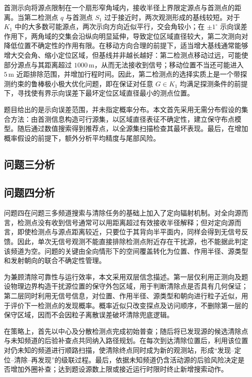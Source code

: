 \documentclass[zihao=-4,a4paper,UTF8,fontset=none]{ctexart}
\begin{document}
首测示向将源点限制在一个扇形窄角域内，接收半径上界限定源点与首测点的距离。当第二检测点 $q$ 与首测点 $S_1$ 过于接近时，两次观测形成的基线较短。对于 $K_1$ 中的大多数可能源点，两次示向方向近似平行，交会角较小；在 $\pm1^\circ$ 示向误差作用下，两角域的交集会沿纵向明显延伸，导致定位区域直径较大，第二次测向对降低位置不确定性的作用有限。在移动方向合理的前提下，适当增大基线通常能够增大交会角、缩小定位区域，但基线并非越长越好：第二检测点移动过远，可能使部分源点与其距离超过 $1000\,\mathrm{m}$，从而无法接收到信号；移动位置不当还可能进入 $5\,\mathrm{m}$ 近距排除范围，并增加行程时间。因此，第二检测点的选择实质上是一个带探测约束的鲁棒极小极大优化问题，即在保证对任意 $G\in K_1$ 均满足探测条件的前提下，寻找使有界示向误差下最坏定位区域直径最小的测点位置。

题目给出的是示向误差范围，并未指定概率分布。本文首先采用无需分布假设的集合方法：由首测信息构造可行源集，以区域直径表征不确定性，建立保守布点模型。随后通过数值搜索得到推荐点，以全源集扫描检查其最坏表现。最后，在增加概率假设的前提下，额外分析平均精度与尾部风险。

\subsection{问题三分析}

\subsection{问题四分析}

问题四在问题三多频道搜索与清除任务的基础上加入了定向辐射机制。对全向源而言，检测点没有收到信号通常可以用距离超过有效接收半径解释；但对定向源而言，即使检测点与源点距离较近，只要位于其背向半平面内，同样会得到无信号反馈。因此，单次无信号观测不能直接排除检测点附近存在干扰源，也不能据此判定该频道为空。问题的关键由全向情形下的空间覆盖转化为位置、作用半径、源类型和发射朝向的联合不确定性管理。

为兼顾清除可靠性与运行效率，本文采用双层信念描述。第一层仅利用正测向及题设物理边界构造干扰源位置的保守外包区域，用于判断清除点是否具有几何保证；第二层同时利用无信号信息，对位置、作用半径、源类型和朝向进行粒子近似，用于评价下一检测点的发现概率。概率近似只改变探点及访问顺序，不删除第一层的保守区域，因而不会因粒子离散误差破坏清除兜底逻辑。

在策略上，首先以中心及分散检测点完成初始普查；随后将已发现源的候选清除点与未知频道的后验补查点共同纳入路径规划。在每次到达清除位置后，利用该位置对仍未知的频道进行顺路扫描，使清除终点同时成为新的观测站，形成“发现--定位--清除--再发现”的级联过程。最后，依据未知频道仍含活动源的后验风险决定是否增加外圈补查；达到题设源数上限或接近运行时限时终止新增搜索动作。
\end{document}
